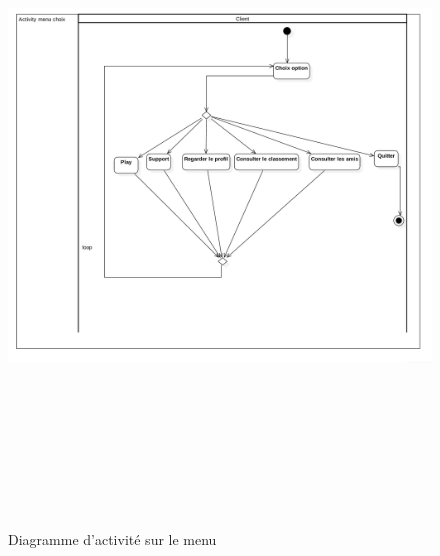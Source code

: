 \documentclass[12pt,a4paper]{article}
\begin{document}
\begin{center}
\begin{figure}[H]
    \includegraphics[height=18cm,width=18cm]{menuActi.png}
    \caption{Diagramme d'activité sur le menu}
    \label{fig:picture}
 \end{figure}
\end{center}
\printindex
\end{document}

